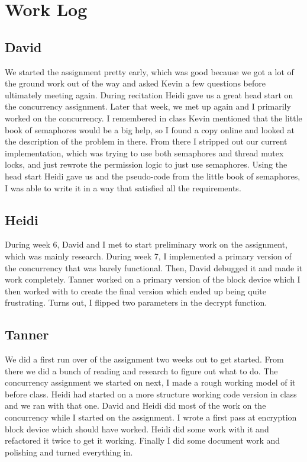 \documentclass{article}
\begin{document}
\section*{Work Log}
\subsection*{David}
We started the assignment pretty early, which was good because we got a lot of the ground 
work out of the way and asked Kevin a few questions before ultimately meeting again. During
recitation Heidi gave us a great head start on the concurrency assignment. Later that week,
we met up again and I primarily worked on the concurrency. I remembered in class Kevin
mentioned that the little book of semaphores would be a big help, so I found a copy online 
and looked at the description of the problem in there. From there I stripped out our current
implementation, which was trying to use both semaphores and thread mutex locks, and just
rewrote the permission logic to just use semaphores. Using the head start Heidi gave us and
the pseudo-code from the little book of semaphores, I was able to write it in a way that
satisfied all the requirements.

\subsection*{Heidi}
During week 6, David and I met to start preliminary work on the assignment, which was mainly research. During week 7, I implemented a primary version of the concurrency that was barely functional. Then, David debugged it and made it work completely. Tanner worked on a primary version of the block device which I then worked with to create the final version which ended up being quite frustrating. Turns out, I flipped two parameters in the decrypt function. 

\subsection{Tanner}
We did a first run over of the assignment two weeks out to get started. 
From there we did a bunch of reading and research to figure out what to do.
The concurrency assignment we started on next, I made a rough working model of it before class.
Heidi had started on a more structure working code version in class and we ran with that one.
David and Heidi did most of the work on the concurrency while I started on the assignment.
I wrote a first pass at encryption block device which should have worked.
Heidi did some work with it and refactored it twice to get it working.
Finally I did some document work and polishing and turned everything in. 
\end{document}

